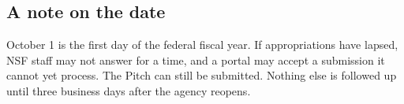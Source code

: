 \subsection{A note on the date}

October 1 is the first day of the federal fiscal year. If appropriations have
lapsed, NSF staff may not answer for a time, and a portal may accept a
submission it cannot yet process. The Pitch can still be submitted. Nothing else
is followed up until three business days after the agency reopens.


